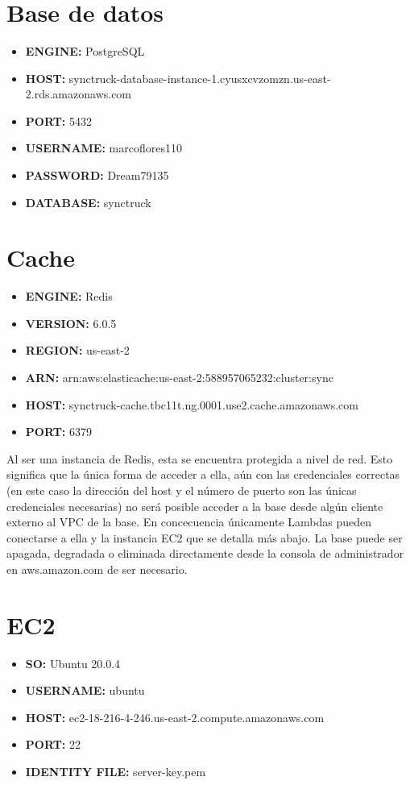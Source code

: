 \documentclass{article}
\author{}
\title{\textbf{\Huge\titulo}}
\date{}
\begin{document}
\maketitle
\section {Base de datos}
\begin{itemize}
        \item \textbf{ENGINE:} PostgreSQL
        \item \textbf{HOST:} synctruck-database-instance-1.cyusxcvzomzn.us-east-2.rds.amazonaws.com
        \item \textbf{PORT:} 5432
        \item \textbf{USERNAME:} marcoflores110
        \item \textbf{PASSWORD:} Dream79135
        \item \textbf{DATABASE:} synctruck
\end{itemize}
\section {Cache}
\begin{itemize}
        \item \textbf{ENGINE:} Redis
        \item \textbf{VERSION:} 6.0.5
        \item \textbf{REGION:} us-east-2
        \item \textbf{ARN:} arn:aws:elasticache:us-east-2:588957065232:cluster:sync
        \item \textbf{HOST:} synctruck-cache.tbc11t.ng.0001.use2.cache.amazonaws.com
        \item \textbf{PORT:} 6379
\end{itemize}
Al ser una instancia de Redis, esta se encuentra protegida a nivel de red. Esto significa
que la única forma de acceder a ella, aún con las credenciales correctas (en este caso
la dirección del host y el número de puerto son las únicas credenciales necesarias) no
será posible acceder a la base desde algún cliente externo al VPC de la base. En concecuencia
únicamente Lambdas pueden conectarse a ella y la instancia EC2 que se detalla más abajo.
La base puede ser apagada, degradada o eliminada directamente desde la consola de administrador
en aws.amazon.com de ser necesario.
\section {EC2}
\begin{itemize}
        \item \textbf{SO:} Ubuntu 20.0.4
        \item \textbf{USERNAME:} ubuntu
        \item \textbf{HOST:} ec2-18-216-4-246.us-east-2.compute.amazonaws.com
        \item \textbf{PORT:} 22
        \item \textbf{IDENTITY FILE:} server-key.pem
\end{itemize}
\end{document}
